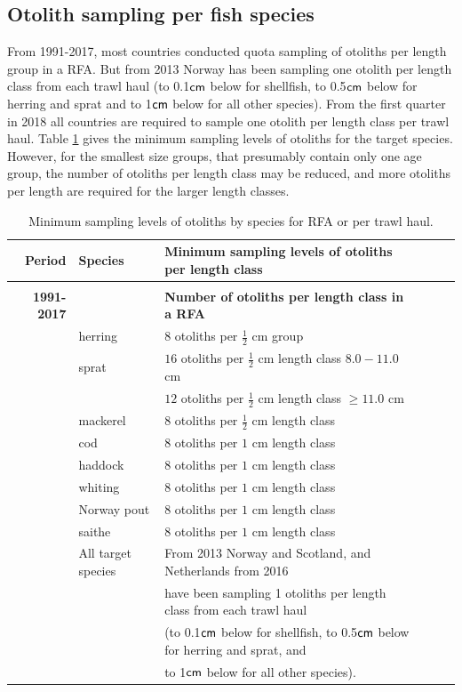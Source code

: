 \documentclass[a4paper 12pt]{article}
\numberwithin{equation}{section}
\newcommand{\cm}{\textnormal{\sffamily cm}\xspace}
\begin{document}
\begin{appendices}
\section{\large Otolith sampling per fish species}
\label{secAp:otolithappendix}
From 1991-2017, most countries conducted quota sampling of otoliths per length group in a RFA. But from 2013 Norway has been sampling one otolith per length class from each trawl haul (to 0.1$\cm$ below for shellfish, to 0.5$\cm$ below for herring and sprat and to 1$\cm$ below for all other species). From the first quarter in 2018 all countries are required to sample one otolith per length class per trawl haul.  Table \ref{tab:otolithsTable} gives the minimum sampling levels of otoliths for the target species. However, for the smallest size groups, that presumably contain only one age group, the number of otoliths per length class may be reduced, and more otoliths per length are required for the larger length classes. \\
\begin{small}
\begin{table}[h!]
\centering
\caption{Minimum sampling levels of otoliths by species for RFA or per trawl haul.}
\label{tab:otolithsTable}
\begin{tabularx}{\linewidth}{r l l l l X}
\toprule 
Period &  Species  & Minimum sampling levels of otoliths per length class    \\[0.7ex]
\midrule \\[0.1ex]
{\bf 1991-2017} & & {\bf Number of otoliths per length class in a RFA}  \\[1.8ex]
     & herring  &  $8$  otoliths per $\frac{1}{2}$ cm group \\[0.8ex]
     & sprat    & $16$  otoliths per $\frac{1}{2}$ cm length class  $8.0 -11.0$ cm\\[0.8ex]
              & & $12$  otoliths per $\frac{1}{2}$ cm length class  $\geq 11.0$ cm\\[0.8ex]
& mackerel      & $8$  otoliths per $\frac{1}{2}$ cm length class \\[0.8ex]
& cod       	  & $8$  otoliths per $1$ cm length class\\[0.8ex]
&haddock   	  & $8$  otoliths per $1$ cm length class \\[0.8ex]
&whiting    	  & $8$  otoliths per $1$ cm length class \\[0.8ex]
&Norway pout   & $8$  otoliths per $1$ cm length class\\[0.8ex]
&saithe        & $8$  otoliths per $1$ cm length class \\[2ex] 
& All target species      &  From 2013 Norway and Scotland, and  Netherlands from 2016 \\[0.7ex] 
&& have been sampling 1 otoliths per length class from each trawl haul \\[0.7ex] 
&& (to 0.1$\cm$ below for shellfish, to 0.5$\cm$ below for herring and sprat, and \\ [0.7ex] 
&& to 1$\cm$ below for all other species).\\[2.7ex] 


\end{tabularx}
\end{table}
\end{small}
\end{appendices}
\end{document}
